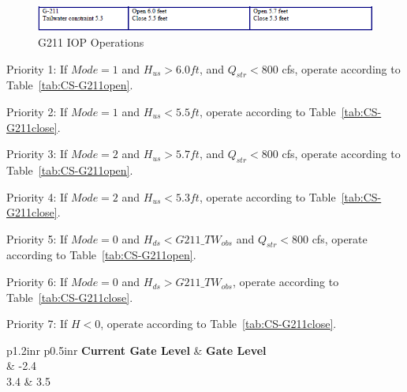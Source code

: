
\begin{figure}[!h]
  \begin{center}
  \includegraphics[width=6.5in]{../figs/G211_IOPops.png}
  \caption{G211 IOP Operations}
  \label{fig:G211iop}
  \end{center}
\end{figure}


\begin{packed_items}
\item Priority 1: If $Mode=1$ and $H_{us}>6.0 ft$, and $Q_{str}<800$ cfs, operate according to Table~\ref{tab:CS-G211open}.
\item Priority 2: If $Mode=1$ and $H_{us}<5.5 ft$, operate according to Table~\ref{tab:CS-G211close}.
\item[]
\item Priority 3: If $Mode=2$ and $H_{us}>5.7 ft$, and $Q_{str}<800$ cfs, operate according to Table~\ref{tab:CS-G211open}.
\item Priority 4: If $Mode=2$ and $H_{us}<5.3 ft$, operate according to Table~\ref{tab:CS-G211close}.
\item[]
\item Priority 5: If $Mode=0$ and $H_{ds}<G211\_TW_{obs}$ and $Q_{str}<800$ cfs, operate according to Table~\ref{tab:CS-G211open}.
\item Priority 6: If $Mode=0$ and $H_{ds}>G211\_TW_{obs}$, operate according to Table~\ref{tab:CS-G211close}.
\item[]
\item Priority 7: If $H<0$, operate according to Table~\ref{tab:CS-G211close}.
\end{packed_items}


\footnotesize
\begin{table}[!h]
\centering
\caption{Control strategy for G211 open (units are ft. NGVD29)}
\label{tab:CS-G211open}
\begin{tabular}{p{1.2in}{r} p{0.5in}{r}}
\hline
\textbf{Current Gate Level} & \textbf{Gate Level}\\
	& -2.4       \\
3.4	& 3.5   \\
\hline
\end{tabular}
\end{table}
\normalsize

